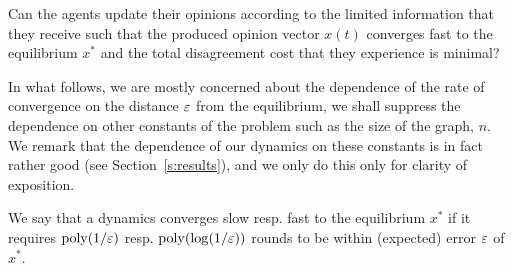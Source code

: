 \begin{question}\label{q:motivation2}
  Can the agents update their opinions according to the limited information
  that they receive such that the produced opinion vector $x(t)$ converges fast
  to the equilibrium $x^*$ and the total disagreement cost that they experience
  is minimal?
\end{question}

In what follows, we are mostly concerned about the dependence of
the rate of convergence on the distance $\varepsilon$ from the equilibrium, we shall
suppress the dependence on other constants of the problem such as the size of
the graph, $n$.  We remark that the dependence of our dynamics on these
constants is in fact rather good (see Section~\ref{s:results}), and we only do
this only for clarity of exposition.

\begin{definition}[Informal]\label{d:convergence_rate}
  We say that a dynamics converges slow resp. fast to the equilibrium $x^*$ if
  it requires $\mathrm{poly}(1/\varepsilon)$ resp. $\mathrm{poly}(\log(1/\varepsilon))$ rounds to
  be within (expected) error $\varepsilon$ of $x^*$.
\end{definition}





